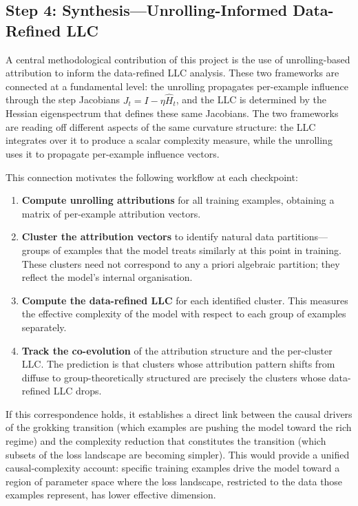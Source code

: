 \documentclass[11pt,a4paper]{article}
\begin{document}
\subsection{Step 4: Synthesis---Unrolling-Informed Data-Refined LLC}\label{sec:synthesis}

A central methodological contribution of this project is the use of unrolling-based attribution to inform the data-refined LLC analysis. These two frameworks are connected at a fundamental level: the unrolling propagates per-example influence through the step Jacobians $J_t = I - \eta \hat{H}_t$, and the LLC is determined by the Hessian eigenspectrum that defines these same Jacobians. The two frameworks are reading off different aspects of the same curvature structure: the LLC integrates over it to produce a scalar complexity measure, while the unrolling uses it to propagate per-example influence vectors.

This connection motivates the following workflow at each checkpoint:

\begin{enumerate}[label=(\roman*)]
    \item \textbf{Compute unrolling attributions} for all training examples, obtaining a matrix of per-example attribution vectors.
    \item \textbf{Cluster the attribution vectors} to identify natural data partitions---groups of examples that the model treats similarly at this point in training. These clusters need not correspond to any a priori algebraic partition; they reflect the model's internal organisation.
    \item \textbf{Compute the data-refined LLC} for each identified cluster. This measures the effective complexity of the model with respect to each group of examples separately.
    \item \textbf{Track the co-evolution} of the attribution structure and the per-cluster LLC. The prediction is that clusters whose attribution pattern shifts from diffuse to group-theoretically structured are precisely the clusters whose data-refined LLC drops.
\end{enumerate}

If this correspondence holds, it establishes a direct link between the causal drivers of the grokking transition (which examples are pushing the model toward the rich regime) and the complexity reduction that constitutes the transition (which subsets of the loss landscape are becoming simpler). This would provide a unified causal-complexity account: specific training examples drive the model toward a region of parameter space where the loss landscape, restricted to the data those examples represent, has lower effective dimension.
\end{document}
